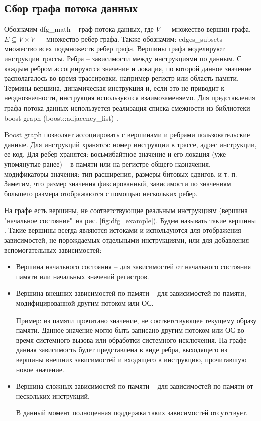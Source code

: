 \subsection{Сбор графа потока данных} \label{sec:dfg_collection}

Обозначим \gls{dfg_math} -- граф потока данных, где $V$ \, -- множество вершин графа, $E \subseteq V \times V$ \, -- множество ребер графа. Также обозначим: \gls{edges_subsets} \, -- множество всех подмножеств ребер графа. Вершины графа моделируют инструкции трассы. Ребра -- зависимости между инструкциями по данным. С каждым ребром ассоциируются значение и локация, по которой данное значение располагалось во время трассировки, например регистр или область памяти. Термины вершина, динамическая инструкция и, если это не приводит к неоднозначности, инструкция используются взаимозаменяемо. Для представления графа потока данных используется реализация списка смежности из библиотеки boost graph (boost::adjacency\_list) \cite{boost_graph_library,boost_adjacency_list}.

Boost graph позволяет ассоциировать с вершинами и ребрами пользовательские данные. Для инструкций хранятся: номер инструкции в трассе, адрес инструкции, ее код. Для ребер хранятся: восьмибайтное значение и его локация (уже упомянутые ранее) -- в памяти или на регистре общего назначения, модификаторы значения: тип расширения, размеры битовых сдвигов, и т. п. Заметим, что размер значения фиксированный, зависимости по значениям большего размера отображаются с помощью нескольких ребер.

На графе есть вершины, не соответствующие реальным инструкциям (вершина "начальное состояние"\, на рис. \ref{fig:dfg_example}). Будем называть такие вершины . Такие вершины всегда являются истоками и используются для отображения зависимостей, не порождаемых отдельными инструкциями, или для добавления вспомогательных зависимостей:

\begin{itemize}
    \item Вершина начального состояния -- для зависимостей от начального состояния памяти или начальных значений регистров.

    \item Вершина внешних зависимостей по памяти -- для зависимостей по памяти, модифицированной другим потоком или ОС.

    Пример: из памяти прочитано значение, не соответствующее текущему образу памяти. Данное значение могло быть записано другим потоком или ОС во время системного вызова или обработки системного исключения. На графе данная зависимость будет представлена в виде ребра, выходящего из вершины внешних зависимостей и входящего в инструкцию, прочитавшую новое значение.

    \item Вершина сложных зависимостей по памяти -- для зависимостей по памяти от нескольких инструкций.

    В данный момент полноценная поддержка таких зависимостей отсутствует.
\end{itemize}

